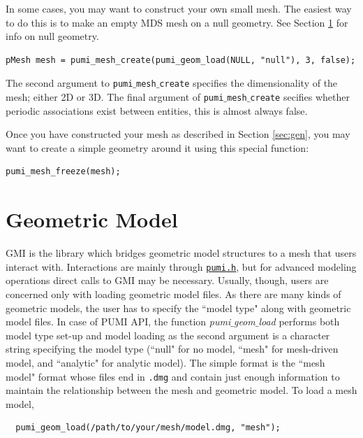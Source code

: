 \documentclass{article}
\begin{document}
In some cases, you may want to construct your own small mesh.
The easiest way to do this is to make an empty MDS mesh
on a null geometry.
See Section \ref{sec:gmi} for info on null geometry.

\begin{lstlisting}
pMesh mesh = pumi_mesh_create(pumi_geom_load(NULL, "null"), 3, false);
\end{lstlisting}

The second argument to \texttt{pumi$\_$mesh$\_$create}
specifies the dimensionality of the mesh; either 2D or 3D.
The final argument of \texttt{pumi$\_$mesh$\_$create} secifies
whether periodic associations exist between entities, this is
almost always false.

Once you have constructed your mesh as described in Section \ref{sec:gen},
you may want to create a simple geometry around it using
this special function:

\begin{lstlisting}
pumi_mesh_freeze(mesh);
\end{lstlisting}

\section{Geometric Model}
\label{sec:gmi}

GMI is the library which bridges geometric model structures
to a mesh that users interact with.
Interactions are mainly through
\href{https://github.com/SCOREC/core/blob/master/pumi/pumi.h}{\texttt{pumi.h}},
but for advanced modeling operations direct calls to GMI may be necessary.
Usually, though, users are concerned only with loading geometric model files.
As there are many kinds of geometric models, the user has to specify the
``model type" along with geometric model files.
In case of PUMI API, the function \emph{pumi$\_$geom$\_$load} performs both
model type set-up and model loading as the second argument is a character
string specifying the model type (``null" for no model, ``mesh" for
mesh-driven model, and ``analytic" for analytic model).
The simple format is the ``mesh model" format whose files end in \texttt{.dmg}
and contain just enough information to maintain the relationship between the
mesh and geometric model.
To load a mesh model,

\begin{lstlisting}
  pumi_geom_load(/path/to/your/mesh/model.dmg, "mesh");
\end{lstlisting}
\end{document}
